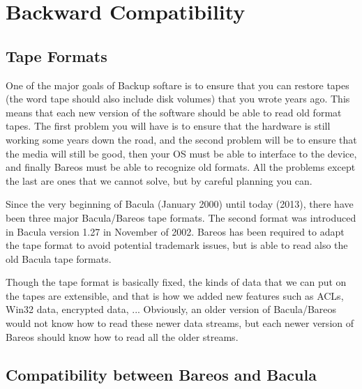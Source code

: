 \chapter{Backward Compatibility}

\section{Tape Formats}


One of the major goals of Backup softare is to ensure that you can restore
tapes (the word tape should also include disk volumes) that you wrote years
ago.  This means that each new version of the software should be able to read old
format tapes. The first problem you will have is to ensure that the
hardware is still working some years down the road, and the second
problem will be to ensure that the media will still be good, then
your OS must be able to interface to the device, and finally Bareos
must be able to recognize old formats.  All the problems except the
last are ones that we cannot solve, but by careful planning you can.

Since the very beginning of Bacula (January 2000) until today (2013),
there have been three major Bacula/Bareos tape formats.  The second format
was introduced in Bacula version 1.27 in November of 2002.
Bareos has been required to adapt the tape format to avoid potential trademark issues,
but is able to read also the old Bacula tape formats.

Though the tape format is basically fixed, the kinds of data that we can put on the
tapes are extensible, and that is how we added new features
such as ACLs, Win32 data, encrypted data, ...  Obviously, an older
version of Bacula/Bareos would not know how to read these newer data streams,
but each newer version of Bareos should know how to read all the
older streams.

%
%
%

\section{Compatibility between Bareos and Bacula}

